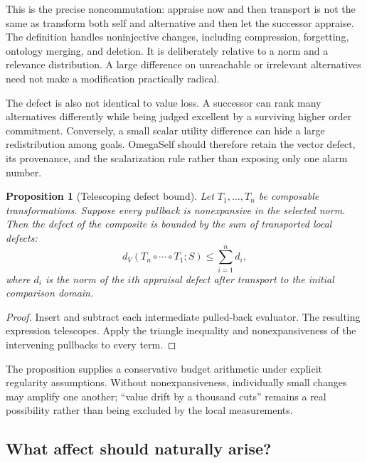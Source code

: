 \documentclass[11pt]{article}
\newtheorem{proposition}{Proposition}
\begin{document}
This is the precise noncommutation: appraise now and then transport is not the
same as transform both self and alternative and then let the successor
appraise.  The definition handles noninjective changes, including compression,
forgetting, ontology merging, and deletion.  It is deliberately relative to a
norm and a relevance distribution.  A large difference on unreachable or
irrelevant alternatives need not make a modification practically radical.

The defect is also not identical to value loss.  A successor can rank many
alternatives differently while being judged excellent by a surviving higher
order commitment.  Conversely, a small scalar utility difference can hide a
large redistribution among goals.  OmegaSelf should therefore retain the
vector defect, its provenance, and the scalarization rule rather than exposing
only one alarm number.

\begin{proposition}[Telescoping defect bound]
Let $T_1,\ldots,T_n$ be composable transformations.  Suppose every pullback is
nonexpansive in the selected norm.  Then the defect of the composite is bounded
by the sum of transported local defects:
\begin{equation}
d_V(T_n\circ\cdots\circ T_1;S)
\leq \sum_{i=1}^n d_i,
\end{equation}
where $d_i$ is the norm of the $i$th appraisal defect after transport to the
initial comparison domain.
\end{proposition}

\begin{proof}
Insert and subtract each intermediate pulled-back evaluator.  The resulting
expression telescopes.  Apply the triangle inequality and nonexpansiveness of
the intervening pullbacks to every term.
\end{proof}

The proposition supplies a conservative budget arithmetic under explicit
regularity assumptions.  Without nonexpansiveness, individually small changes
may amplify one another; ``value drift by a thousand cuts'' remains a real
possibility rather than being excluded by the local measurements.

\subsection{What affect should naturally arise?}
\end{document}
